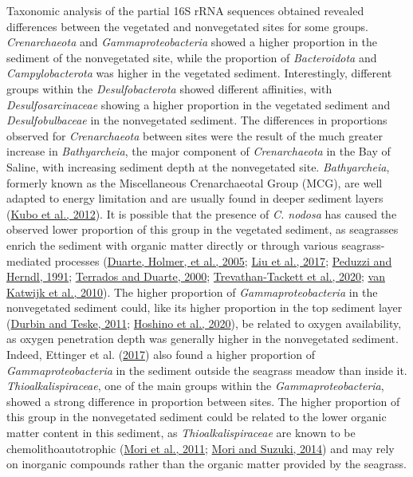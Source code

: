 \documentclass[
  12 pt,
]{book}
\begin{document}
Taxonomic analysis of the partial 16S rRNA sequences obtained revealed differences between the vegetated and nonvegetated sites for some groups. \emph{Crenarchaeota} and \emph{Gammaproteobacteria} showed a higher proportion in the sediment of the nonvegetated site, while the proportion of \emph{Bacteroidota} and \emph{Campylobacterota} was higher in the vegetated sediment. Interestingly, different groups within the \emph{Desulfobacterota} showed different affinities, with \emph{Desulfosarcinaceae} showing a higher proportion in the vegetated sediment and \emph{Desulfobulbaceae} in the nonvegetated sediment. The differences in proportions observed for \emph{Crenarchaeota} between sites were the result of the much greater increase in \emph{Bathyarcheia}, the major component of \emph{Crenarchaeota} in the Bay of Saline, with increasing sediment depth at the nonvegetated site. \emph{Bathyarcheia}, formerly known as the Miscellaneous Crenarchaeotal Group (MCG), are well adapted to energy limitation and are usually found in deeper sediment layers (\protect\hyperlink{ref-Kubo2012}{Kubo et al., 2012}). It is possible that the presence of \emph{C. nodosa} has caused the observed lower proportion of this group in the vegetated sediment, as seagrasses enrich the sediment with organic matter directly or through various seagrass-mediated processes (\protect\hyperlink{ref-Duarte2005}{Duarte, Holmer, et al., 2005}; \protect\hyperlink{ref-Liu2017}{Liu et al., 2017}; \protect\hyperlink{ref-Peduzzi1991}{Peduzzi and Herndl, 1991}; \protect\hyperlink{ref-Terrados2000}{Terrados and Duarte, 2000}; \protect\hyperlink{ref-Trevathan-Tackett2020}{Trevathan-Tackett et al., 2020}; \protect\hyperlink{ref-vanKatwijk2010}{van Katwijk et al., 2010}). The higher proportion of \emph{Gammaproteobacteria} in the nonvegetated sediment could, like its higher proportion in the top sediment layer (\protect\hyperlink{ref-Durbin2011}{Durbin and Teske, 2011}; \protect\hyperlink{ref-Hoshino2020}{Hoshino et al., 2020}), be related to oxygen availability, as oxygen penetration depth was generally higher in the nonvegetated sediment. Indeed, Ettinger et al. (\protect\hyperlink{ref-Ettinger2017}{2017}) also found a higher proportion of \emph{Gammaproteobacteria} in the sediment outside the seagrass meadow than inside it. \emph{Thioalkalispiraceae}, one of the main groups within the \emph{Gammaproteobacteria}, showed a strong difference in proportion between sites. The higher proportion of this group in the nonvegetated sediment could be related to the lower organic matter content in this sediment, as \emph{Thioalkalispiraceae} are known to be chemolithoautotrophic (\protect\hyperlink{ref-Mori2011}{Mori et al., 2011}; \protect\hyperlink{ref-Mori2014}{Mori and Suzuki, 2014}) and may rely on inorganic compounds rather than the organic matter provided by the seagrass.
\end{document}
